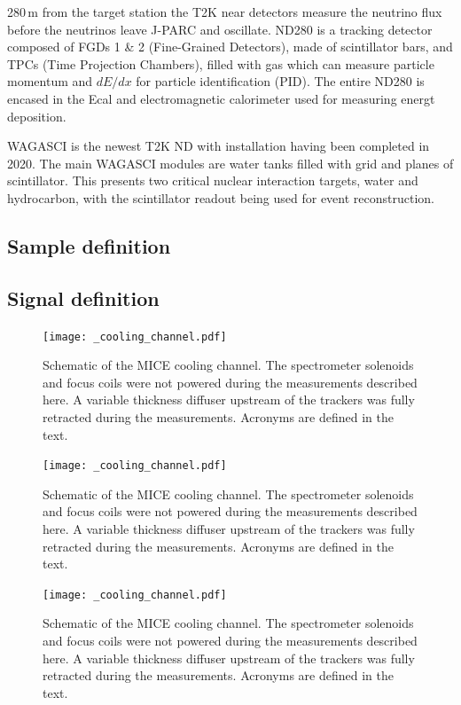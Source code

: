 \documentclass[%
 reprint,
 amsmath,amssymb,
 aps,
]{revtex4-2}
\begin{document}
280\,m from the target station the T2K near detectors measure the neutrino flux before the neutrinos leave J-PARC and oscillate. ND280 is a tracking detector composed of FGDs 1 \& 2 (Fine-Grained Detectors), made of scintillator bars, and TPCs (Time Projection Chambers), filled with gas which can measure particle momentum and $dE/dx$ for particle identification (PID). The entire ND280 is encased in the Ecal and electromagnetic calorimeter used for measuring energt deposition. 

WAGASCI is the newest T2K ND with installation having been completed in 2020. The main WAGASCI modules are water tanks filled with grid and planes of scintillator. This presents two critical nuclear interaction targets, water and hydrocarbon, with the scintillator readout being used for event reconstruction. 
\subsection{Sample definition}
\label{sec:selection}

\subsection{Signal definition}
\label{sec:seldef}
\begin{figure}[htbp]
\begin{center}
\texttt{[image: \_cooling\_channel.pdf]}
\end{center}
\caption{Schematic of the MICE cooling channel. The spectrometer solenoids and focus coils were not powered during the measurements described here. A variable thickness diffuser upstream of the trackers was fully retracted during the measurements. Acronyms are defined in the text.}
\label{fig:micecc}
\end{figure}
\begin{figure}[htbp]
\begin{center}
\texttt{[image: \_cooling\_channel.pdf]}
\end{center}
\caption{Schematic of the MICE cooling channel. The spectrometer solenoids and focus coils were not powered during the measurements described here. A variable thickness diffuser upstream of the trackers was fully retracted during the measurements. Acronyms are defined in the text.}
\label{fig:micecc}
\end{figure}
\begin{figure}[htbp]
\begin{center}
\texttt{[image: \_cooling\_channel.pdf]}
\end{center}
\caption{Schematic of the MICE cooling channel. The spectrometer solenoids and focus coils were not powered during the measurements described here. A variable thickness diffuser upstream of the trackers was fully retracted during the measurements. Acronyms are defined in the text.}
\label{fig:micecc}
\end{figure}
\end{document}
